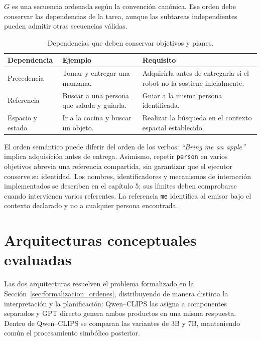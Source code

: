 $G$ es una secuencia ordenada según la convención canónica. Ese orden debe conservar las dependencias de la tarea, aunque las subtareas independientes pueden admitir otras secuencias válidas.

\begin{table}[htbp]
\centering
\caption{Dependencias que deben conservar objetivos y planes.}
\label{tab:dependencias_objetivos}
\begin{tabularx}{\textwidth}{@{}p{}XX@{}}
\toprule
\textbf{Dependencia} & \textbf{Ejemplo} & \textbf{Requisito} \\
\midrule
Precedencia & Tomar y entregar una manzana. & Adquirirla antes de entregarla si el robot no la sostiene inicialmente. \\
Referencia & Buscar a una persona que saluda y guiarla. & Guiar a la misma persona identificada. \\
Espacio y estado & Ir a la cocina y buscar un objeto. & Realizar la búsqueda en el contexto espacial establecido. \\
\bottomrule
\end{tabularx}
\end{table}

El orden semántico puede diferir del orden de los verbos: \textit{``Bring me an apple''} implica adquisición antes de entrega. Asimismo, repetir \texttt{person} en varios objetivos abrevia una referencia compartida, sin garantizar que el ejecutor conserve su identidad. Los nombres, identificadores y mecanismos de interacción implementados se describen en el capítulo 5; sus límites deben comprobarse cuando intervienen varios referentes. La referencia \texttt{me} identifica al emisor bajo el contexto declarado y no a cualquier persona encontrada.

\section{Arquitecturas conceptuales evaluadas}
\label{sec:arquitecturas_conceptuales}

Las dos arquitecturas resuelven el problema formalizado en la
Sección~\ref{sec:formalizacion_ordenes}, distribuyendo de manera distinta
la interpretación y la planificación: Qwen--CLIPS las asigna a componentes
separados y GPT directo genera ambos productos en una misma respuesta.
Dentro de Qwen--CLIPS se comparan las variantes de 3B y 7B, manteniendo
común el procesamiento simbólico posterior.

